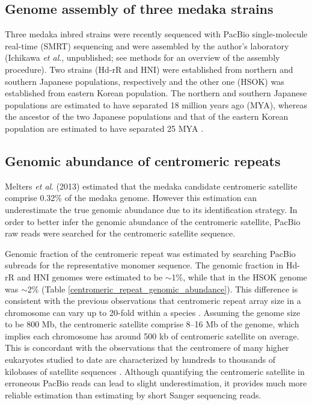 \subsection*{Genome assembly of three medaka strains}
  Three medaka inbred strains were recently sequenced with PacBio single-molecule real-time (SMRT) sequencing and were assembled by the author's laboratory (Ichikawa \textit{et al}., unpublished; see methods for an overview of the assembly procedure). Two strains (Hd-rR and HNI) were established from northern and southern Japanese populations, respectively and the other one (HSOK) was established from eastern Korean population. The northern and southern Japanese populations are estimated to have separated 18 million years ago (MYA), whereas the ancestor of the two Japanese populations and that of the eastern Korean population are estimated to have separated 25 MYA \cite{Setiamarga}.



\subsection*{Genomic abundance of centromeric repeats}
  Melters \textit{et al}. (2013) estimated that the medaka candidate centromeric satellite comprise 0.32\% of the medaka genome. However this estimation can underestimate the true genomic abundance due to its identification strategy. In order to better infer the genomic abundance of the centromeric satellite, PacBio raw reads were searched for the centromeric satellite sequence.

  Genomic fraction of the centromeric repeat was estimated by searching PacBio subreads for the representative monomer sequence. The genomic fraction in Hd-rR and HNI genomes were estimated to be $\sim$1\%, while that in the HSOK genome was $\sim$2\% (Table \ref{centromeric_repeat_genomic_abundance}). This difference is consistent with the previous observations that centromeric repeat array size in a chromosome can vary up to 20-fold within a species \cite{Miga}. Assuming the genome size to be 800 Mb, the centromeric satellite comprise 8--16 Mb of the genome, which implies each chromosome has around 500 kb of centromeric satellite on average. This is concordant with the observations that the centromere of many higher eukaryotes studied to date are characterized by hundreds to thousands of kilobases of satellite sequences \cite{Plohl}. Although quantifying the centromeric satellite in erroneous PacBio reads can lead to slight underestimation, it provides much more reliable estimation than estimating by short Sanger sequencing reads.

